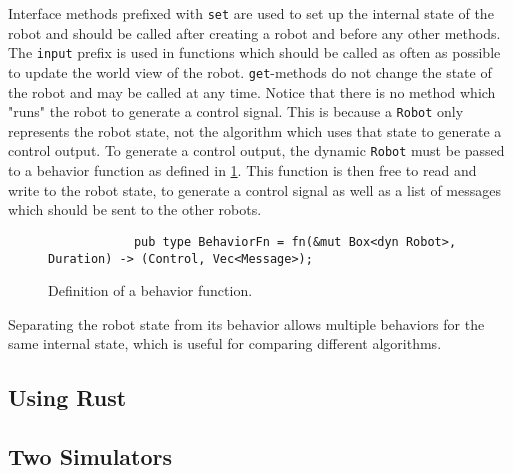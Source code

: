 Interface methods prefixed with \texttt{set} are used to set up the internal state of the robot and should be called after creating a robot and before any other methods. The \texttt{input} prefix is used in functions which should be called as often as possible to update the world view of the robot. \texttt{get}-methods do not change the state of the robot and may be called at any time. Notice that there is no method which "runs" the robot to generate a control signal. This is because a \texttt{Robot} only represents the robot state, not the algorithm which uses that state to generate a control output. To generate a control output, the dynamic \texttt{Robot} must be passed to a behavior function as defined in \cref{fig:behavior-fn}. This function is then free to read and write to the robot state, to generate a control signal as well as a list of messages which should be sent to the other robots.

\begin{figure}[H]
    \begin{center}
        \begin{verbatim}
            pub type BehaviorFn = fn(&mut Box<dyn Robot>, Duration) -> (Control, Vec<Message>);
        \end{verbatim}
    \end{center}
    \caption{Definition of a behavior function.}\label{fig:behavior-fn}
\end{figure}

Separating the robot state from its behavior allows multiple behaviors for the same internal state, which is useful for comparing different algorithms.

\subsection{Using Rust}

\subsection{Two Simulators}
